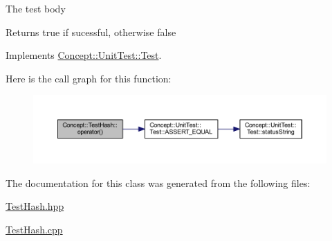 The test body \begin{DoxyReturn}{Returns}
true if sucessful, otherwise false 
\end{DoxyReturn}


Implements \mbox{\hyperlink{class_concept_1_1_unit_test_1_1_test_aa8c081714f642696eeef640911be752a}{Concept\+::\+Unit\+Test\+::\+Test}}.

Here is the call graph for this function\+:\nopagebreak
\begin{figure}[H]
\begin{center}
\leavevmode
\includegraphics[width=350pt]{class_concept_1_1_test_hash_aaa06219ede091614bb050ede4f8676f0_cgraph}
\end{center}
\end{figure}


The documentation for this class was generated from the following files\+:\begin{DoxyCompactItemize}
\item 
\mbox{\hyperlink{_test_hash_8hpp}{Test\+Hash.\+hpp}}\item 
\mbox{\hyperlink{_test_hash_8cpp}{Test\+Hash.\+cpp}}\end{DoxyCompactItemize}
